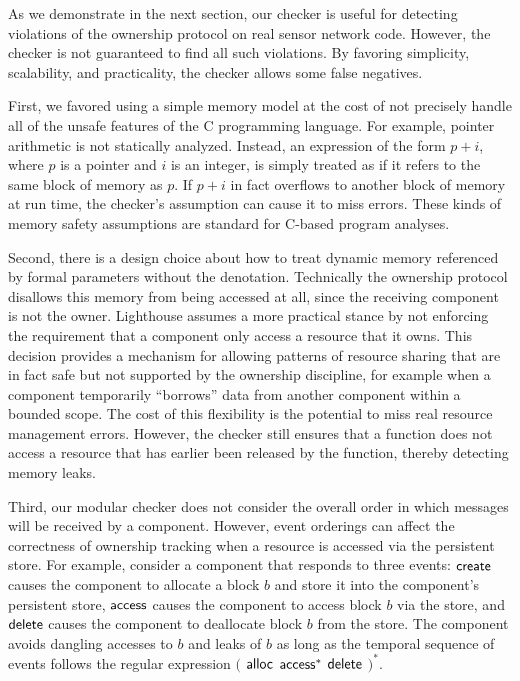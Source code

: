As we demonstrate in the next section, our checker is useful for detecting
violations of the ownership protocol on real sensor network code.  
%
However, the checker is not guaranteed to find all such violations.  
%
By favoring simplicity, scalability, and practicality, the checker allows some
false negatives.




First, we favored using a simple memory model at the cost of not precisely
handle all of the unsafe features of the C programming language.  
%
For example, pointer arithmetic is not statically analyzed.  
%
Instead, an expression of the form $p+i$, where $p$ is a pointer and $i$ is an
integer, is simply treated as if it refers to the same block of memory as $p$.  
%
If $p+i$ in fact overflows to another block of memory at run time, the
checker's assumption can cause it to miss errors.  
%
These kinds of memory safety assumptions are standard for C-based program
analyses.



Second, there is a design choice about how to treat dynamic memory referenced
by formal parameters without the  denotation.
%
Technically the ownership protocol disallows this memory from being accessed
at all, since the receiving component is not the owner.  
%
Lighthouse assumes a more practical stance by not enforcing the requirement
that a component only access a resource that it owns.
% 
%
This decision 
provides a mechanism for allowing patterns of resource sharing that are in
fact safe but not supported by the ownership discipline, for example when a
component temporarily ``borrows'' data from another component within a bounded
scope.
%
The cost of this flexibility is the potential to miss real resource management
errors.
%
However, the checker still ensures that a function does not access a resource
that has earlier been released by the function, thereby detecting memory
leaks.



Third, our modular checker does not consider the overall order in which
messages will be received by a component.  
%
However, event orderings can affect the correctness of ownership tracking
when a resource is accessed via the persistent store.
%
For example, consider a component that responds to three events: ${\mathsf{create}}$
causes the component to allocate a block $b$ and store it into the
component's persistent store, ${\mathsf{access}}$ causes the component to access block
$b$ via the store, and ${\mathsf{delete}}$ causes the component to deallocate block
$b$ from the store.  
%
The component avoids dangling accesses to $b$ and leaks of $b$ as long as
the temporal sequence of events follows the regular expression $($ ${\mathsf{alloc}}$
${\mathsf{access}}^*$ ${\mathsf{delete}}$ $)^*$.  



